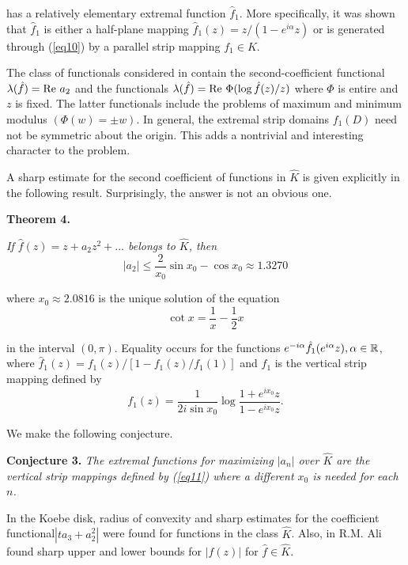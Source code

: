 \documentclass[final]{siamltex}
\begin{document}
\noindent has a relatively elementary extremal function $\hat{f}_1$.  More specifically, it was shown that $\hat{f}_1$ is either
a half-plane mapping $\hat{f}_1(z) = z/(1 - e^{i \alpha}z)$ or is generated through (\ref{eq10}) by a parallel strip mapping $f_1 \in K$.

The class of functionals considered in \cite{BarnardSchober1} contain the second-coefficient functional $\lambda(\hat{f}) = {\rm Re} \  a_2$ and the functionals $\lambda(\hat{f}) = {\rm Re} \  \Phi (\log \hat{f}(z)/z)$ where $\Phi$ is entire and $z$ is fixed.  The latter functionals include the problems of maximum and minimum modulus $( \Phi(w) = \pm w)$.  In general, the extremal strip domains $f_1(D)$ need not be symmetric
about the origin.  This adds a nontrivial and interesting character to the problem.  

A sharp estimate for the second coefficient of functions in $\hat{K}$ is given explicitly in the following result.  Surprisingly,
the answer is not an obvious one.

\vspace{0.1in}

{\bf Theorem 4.} {\em If $\hat{f}(z) = z + a_2 z^2 + . . . $ belongs to $\hat{K}$, then
$$|a_2| \leq \frac{2}{x_0} \sin x_0 - \cos x_0 \approx 1.3270$$

\noindent where $x_0 \approx 2.0816$ is the unique solution of the equation
$$\cot x = \frac{1}{x} - \frac{1}{2}x$$

\noindent in the interval $(0, \pi)$.  Equality occurs for the functions $e^{-i \alpha}\hat{f}_1(e^{i \alpha}z), \alpha \in {\Bbb R}$, where
$\hat{f}_1(z) = f_1(z)/[1-f_1(z)/f_1(1)]$ and $f_1$ is the vertical strip mapping defined by
\begin{equation}
f_1(z) = \frac{1}{2i \sin x_0} \log \frac{1 + e^{i x_0} z}{1 - e^{i x_0} z}. \label{eq11}
\end{equation}}

We make the following conjecture.

\vspace{0.1in}

{\bf Conjecture 3.} {\em The extremal functions for maximizing $|a_n|$ over $\hat{K}$ are the vertical strip mappings defined 
by (\ref{eq11}) where a different $x_0$ is needed for each $n$. }

\vspace{0.1in}

In \cite{BarnardSchober2} the Koebe disk, radius of convexity and sharp estimates for the coefficient functional$|t a_3 + a_2^2|$ were found for
functions in the class $\hat{K}$.  Also, in \cite{Ali1} R.M. Ali found sharp upper and lower bounds for $|f(z)|$ for $\hat{f} \in \hat{K}$.
\end{document}
